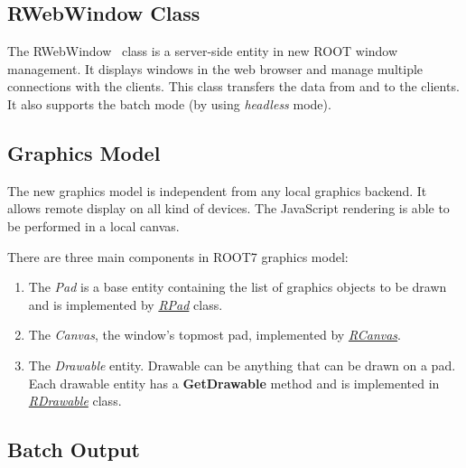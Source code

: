 \documentclass[a4paper]{jpconf}
\begin{document}
\subsection{RWebWindow Class}
The RWebWindow~\cite{rweb} class is a server-side entity in new ROOT window management.
It displays windows in the web browser and manage multiple connections with the clients.
This class transfers the data from and to the clients. It also supports the batch
mode (by using \textit{headless} mode).

 \subsection{Graphics Model}
 The new graphics model is independent from any local graphics backend. It allows
 remote display on all kind of devices. The JavaScript rendering is able to be
 performed in a local canvas.

There are three main components in ROOT7 graphics model:
\begin{enumerate}[label=\alph*)]
  \item The \textit{Pad} is a base entity containing the list of graphics objects to be drawn and is implemented by \textit{\href{https://root.cern.ch/doc/master/classROOT_1_1Experimental_1_1RPad.html}{RPad}} class.
  \item The \textit{Canvas}, the window's topmost pad, implemented by \textit{\href{https://root.cern.ch/doc/master/classROOT_1_1Experimental_1_1RCanvas.html}{RCanvas}}.
  \item The \textit{Drawable} entity. Drawable can be anything that can be drawn on a pad. Each drawable entity has a \textbf{GetDrawable} method and is implemented in \textit{\href{https://root.cern.ch/doc/master/classROOT_1_1Experimental_1_1RDrawable.html}{RDrawable}} class.
\end{enumerate}


\subsection{Batch Output}
\end{document}
